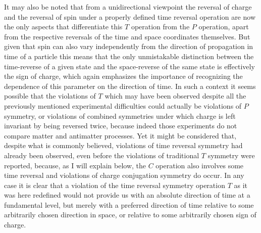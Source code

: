 \documentclass[notitlepage,12pt]{report}
\begin{document}
It may also be noted that from a unidirectional viewpoint the reversal of charge and the reversal of spin under a properly defined time reversal operation are now the only aspects that differentiate this $T$ operation from the $P$ operation, apart from the respective reversals of the time and space coordinates themselves. But given that spin can also vary independently from the direction of propagation in time of a particle this means that the only unmistakable distinction between the time-reverse of a given state and the space-reverse of the same state is effectively the sign of charge, which again emphasizes the importance of recognizing the dependence of this parameter on the direction of time. In such a context it seems possible that the violations of $T$ which may have been observed despite all the previously mentioned experimental difficulties could actually be violations of $P$ symmetry, or violations of combined symmetries under which charge is left invariant by being reversed twice, because indeed those experiments do not compare matter and antimatter processes. Yet it might be considered that, despite what is commonly believed, violations of time reversal symmetry had already been observed, even before the violations of traditional $T$ symmetry were reported, because, as I will explain below, the $C$ operation also involves some time reversal and violations of charge conjugation symmetry do occur. In any case it is clear that a violation of the time reversal symmetry operation $T$ as it was here redefined would not provide us with an absolute direction of time at a fundamental level, but merely with a preferred direction of time relative to some arbitrarily chosen direction in space, or relative to some arbitrarily chosen sign of charge.
\end{document}
